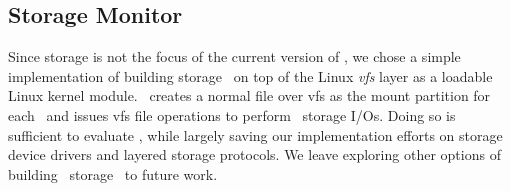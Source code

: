 \documentclass[10pt,times,twocolumn]{z2-article}
\begin{document}
{{{{{{{\subsection{Storage Monitor}
Since storage is not the focus of the current version of \lego,
we chose a simple implementation of building storage \microos\ on top of the Linux {\em vfs} layer as a loadable Linux kernel module.
\lego\ creates a normal file over vfs as the mount partition for each \vnode\
and issues vfs file operations to perform \lego\ storage I/Os.
Doing so is sufficient to evaluate \lego, while largely saving our implementation efforts on storage device drivers and layered storage protocols.
We leave exploring other options of building \lego\ storage \microos\ to future work.


}}}}}}}
\end{document}
